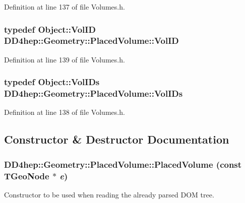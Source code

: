 Definition at line 137 of file Volumes.h.\hypertarget{class_d_d4hep_1_1_geometry_1_1_placed_volume_aaecde4f8feb863af7cd36c1213bfabe4}{
\subsubsection[{VolID}]{\setlength{\rightskip}{0pt plus 5cm}typedef {\bf Object::VolID} {\bf DD4hep::Geometry::PlacedVolume::VolID}}}
\label{class_d_d4hep_1_1_geometry_1_1_placed_volume_aaecde4f8feb863af7cd36c1213bfabe4}


Definition at line 139 of file Volumes.h.\hypertarget{class_d_d4hep_1_1_geometry_1_1_placed_volume_a4383991fbc94adc2997ef98c9d30d9a6}{
\subsubsection[{VolIDs}]{\setlength{\rightskip}{0pt plus 5cm}typedef {\bf Object::VolIDs} {\bf DD4hep::Geometry::PlacedVolume::VolIDs}}}
\label{class_d_d4hep_1_1_geometry_1_1_placed_volume_a4383991fbc94adc2997ef98c9d30d9a6}


Definition at line 138 of file Volumes.h.

\subsection{Constructor \& Destructor Documentation}
\hypertarget{class_d_d4hep_1_1_geometry_1_1_placed_volume_ad5ba4a479af1d8ae77357d34bb91fe00}{
\subsubsection[{PlacedVolume}]{\setlength{\rightskip}{0pt plus 5cm}DD4hep::Geometry::PlacedVolume::PlacedVolume (const TGeoNode $\ast$ {\em e})}}
\label{class_d_d4hep_1_1_geometry_1_1_placed_volume_ad5ba4a479af1d8ae77357d34bb91fe00}


Constructor to be used when reading the already parsed DOM tree. 

